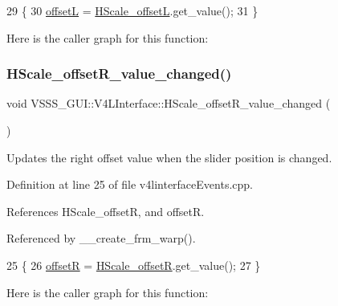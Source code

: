 \begin{DoxyCode}
29                                                     \{
30         \hyperlink{class_v_s_s_s___g_u_i_1_1_v4_l_interface_a4e43fc5295bdec46e8e2fd24bf719e0b}{offsetL} = \hyperlink{class_v_s_s_s___g_u_i_1_1_v4_l_interface_a7261b87cb8ad1293c79003c48c99558a}{HScale\_offsetL}.get\_value();
31     \}
\end{DoxyCode}
Here is the caller graph for this function\+:
\mbox{\label{class_v_s_s_s___g_u_i_1_1_v4_l_interface_aee8d612db51e54e9fdcd13fe97dac999}} 
\subsubsection{\texorpdfstring{H\+Scale\+\_\+offset\+R\+\_\+value\+\_\+changed()}{HScale\_offsetR\_value\_changed()}}
{\footnotesize\ttfamily void V\+S\+S\+S\+\_\+\+G\+U\+I\+::\+V4\+L\+Interface\+::\+H\+Scale\+\_\+offset\+R\+\_\+value\+\_\+changed (\begin{DoxyParamCaption}{ }\end{DoxyParamCaption})}



Updates the right offset value when the slider position is changed. 



Definition at line 25 of file v4linterface\+Events.\+cpp.



References H\+Scale\+\_\+offsetR, and offsetR.



Referenced by \+\_\+\+\_\+create\+\_\+frm\+\_\+warp().


\begin{DoxyCode}
25                                                     \{
26         \hyperlink{class_v_s_s_s___g_u_i_1_1_v4_l_interface_a8bb9caa477b417f549198ea059375f06}{offsetR} = \hyperlink{class_v_s_s_s___g_u_i_1_1_v4_l_interface_a50fa202e4b9ec95b2c009a324aea10fb}{HScale\_offsetR}.get\_value();
27     \}
\end{DoxyCode}
Here is the caller graph for this function\+:
\mbox{\label{class_v_s_s_s___g_u_i_1_1_v4_l_interface_adf76dc7c716d55604384a0fd447fdd5d}} 
